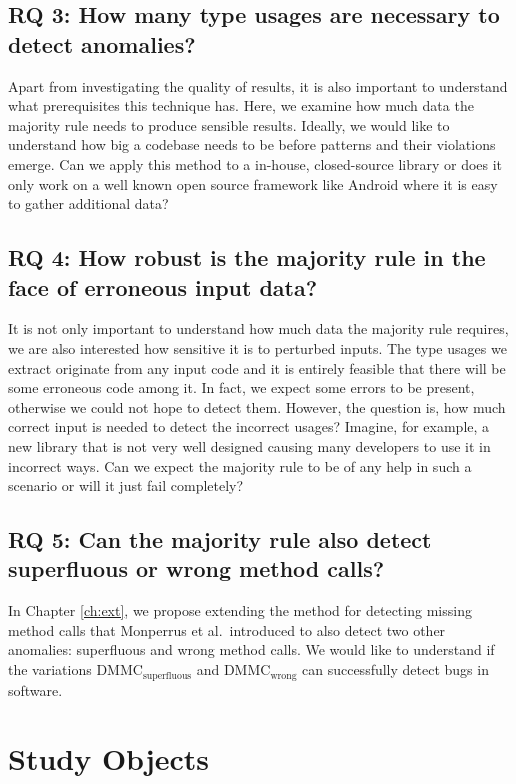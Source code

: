 \subsection*{RQ 3: How many type usages are necessary to detect anomalies?}

Apart from investigating the quality of results, it is also important to understand what prerequisites this technique has.
Here, we examine how much data the majority rule needs to produce sensible results.
Ideally, we would like to understand how big a codebase needs to be before patterns and their violations emerge.
Can we apply this method to a in-house, closed-source library or does it only work on a well known open source framework like Android where it is easy to gather additional data?

\subsection*{RQ 4: How robust is the majority rule in the face of erroneous input data?}

It is not only important to understand how much data the majority rule requires, we are also interested how sensitive it is to perturbed inputs.
The type usages we extract originate from any input code and it is entirely feasible that there will be some erroneous code among it.
In fact, we expect some errors to be present, otherwise we could not hope to detect them.
However, the question is, how much correct input is needed to detect the incorrect usages?
Imagine, for example, a new library that is not very well designed causing many developers to use it in incorrect ways.
Can we expect the majority rule to be of any help in such a scenario or will it just fail completely?

\subsection*{RQ 5: Can the majority rule also detect superfluous or wrong method calls?}

In Chapter \ref{ch:ext}, we propose extending the method for detecting missing method calls that Monperrus et al.\ introduced to also detect two other anomalies: superfluous and wrong method calls.
We would like to understand if the variations $\text{DMMC}_\text{superfluous}$ and $\text{DMMC}_\text{wrong}$ can successfully detect bugs in software.

\section{Study Objects} 

